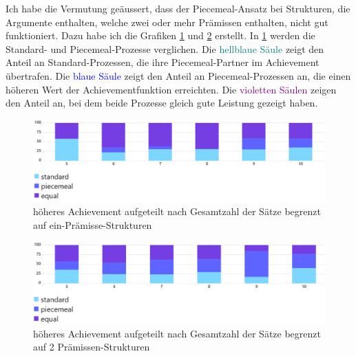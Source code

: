\documentclass{article}
\begin{document}
Ich habe die Vermutung geäussert, dass der Piecemeal-Ansatz bei Strukturen, die Argumente enthalten, welche zwei oder mehr Prämissen enthalten, nicht gut funktioniert. Dazu habe ich die Grafiken \ref{fig:höheres Achievement aufgeteilt nach Poolsize begrenzt auf eine Prämisse} und \ref{fig:höheres Achievement aufgeteilt nach Poolsize begrenzt auf max 2 Prämissen} erstellt. In \ref{fig:höheres Achievement aufgeteilt nach Poolsize begrenzt auf eine Prämisse} werden die Standard- und Piecemeal-Prozesse verglichen. Die \textcolor{teal}{hellblaue Säule} zeigt den Anteil an Standard-Prozessen, die ihre Piecemeal-Partner im Achievement übertrafen. Die \textcolor{blue}{blaue Säule} zeigt den Anteil an Piecemeal-Prozessen an, die einen höheren Wert der Achievementfunktion erreichten. Die \textcolor{purple}{violetten Säulen} zeigen den Anteil an, bei dem beide Prozesse gleich gute Leistung gezeigt haben.

\begin{figure}[ht]
  \centering
  \includegraphics[width=\textwidth]{höheres Achievement aufgeteilt nach Poolsize begrenzt auf eine Prämisse}
  \caption{höheres Achievement aufgeteilt nach Gesamtzahl der Sätze begrenzt auf ein-Prämisse-Strukturen\label{fig:höheres Achievement aufgeteilt nach Poolsize begrenzt auf eine Prämisse}}
\end{figure}

\begin{figure}[ht]
  \centering
  \includegraphics[width=\textwidth]{höheres Achievement aufgeteilt nach Poolsize begrenzt auf max 2 Prämissen}
  \caption{höheres Achievement aufgeteilt nach Gesamtzahl der Sätze begrenzt auf 2 Prämissen-Strukturen\label{fig:höheres Achievement aufgeteilt nach Poolsize begrenzt auf max 2 Prämissen}}
\end{figure}
\end{document}
